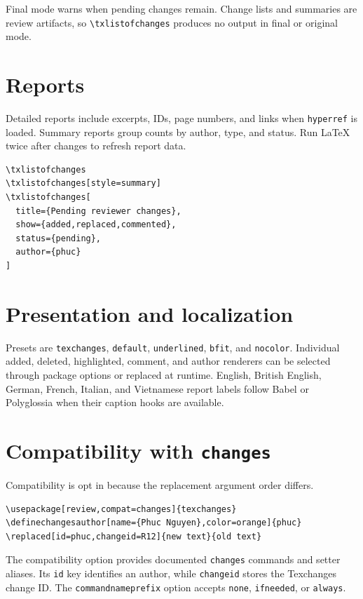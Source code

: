 \documentclass[11pt]{article}
\begin{document}
Final mode warns when pending changes remain. Change lists and summaries are
review artifacts, so \verb|\txlistofchanges| produces no output in final or
original mode.

\section{Reports}

Detailed reports include excerpts, IDs, page numbers, and links when
\texttt{hyperref} is loaded. Summary reports group counts by author, type, and
status. Run LaTeX twice after changes to refresh report data.

\begin{lstlisting}
\txlistofchanges
\txlistofchanges[style=summary]
\txlistofchanges[
  title={Pending reviewer changes},
  show={added,replaced,commented},
  status={pending},
  author={phuc}
]
\end{lstlisting}

\section{Presentation and localization}

Presets are \texttt{texchanges}, \texttt{default}, \texttt{underlined},
\texttt{bfit}, and \texttt{nocolor}. Individual added, deleted, highlighted,
comment, and author renderers can be selected through package options or
replaced at runtime. English, British English, German, French, Italian, and
Vietnamese report labels follow Babel or Polyglossia when their caption hooks
are available.

\section{Compatibility with \texttt{changes}}

Compatibility is opt in because the replacement argument order differs.

\begin{lstlisting}
\usepackage[review,compat=changes]{texchanges}
\definechangesauthor[name={Phuc Nguyen},color=orange]{phuc}
\replaced[id=phuc,changeid=R12]{new text}{old text}
\end{lstlisting}

The compatibility option provides documented \texttt{changes} commands and
setter aliases. Its \texttt{id} key identifies an author, while
\texttt{changeid} stores the Texchanges change ID. The
\texttt{commandname\allowbreak prefix} option accepts \texttt{none}, \texttt{ifneeded},
or \texttt{always}.
\end{document}

